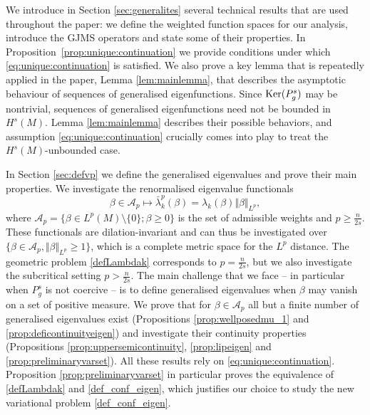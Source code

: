 \documentclass[10pt]{amsart}
\numberwithin{equation}{section}
\def\ker{{\mathop{\rm Ker}}}
\theoremstyle{plain}
\theoremstyle{remark}
\begin{document}
We introduce in Section \ref{sec:generalites} several technical results that are used throughout the paper: we define the weighted function spaces for our analysis, introduce the GJMS operators and state some of their properties. In Proposition~\ref{prop:unique:continuation} we provide conditions under which \eqref{eq:unique:continuation} is satisfied.  We also prove a key lemma that is repeatedly applied in the paper, Lemma \ref{lem:mainlemma}, that describes the asymptotic behaviour of sequences of generalised eigenfunctions. Since $\ker(P_g^s)$ may be nontrivial, sequences of generalised eigenfunctions need not be bounded in $H^s(M)$. Lemma  \ref{lem:mainlemma} describes their possible behaviors, and assumption \eqref{eq:unique:continuation} crucially comes into play to treat the $H^s(M)$-unbounded case. 

\medskip

In Section \ref{sec:defvp} we define the generalised eigenvalues and prove their main properties. We investigate the renormalised eigenvalue functionals 
$$\beta \in \mathcal{A}_p  \mapsto \bar{\lambda}_k^p(\beta) = \lambda_k(\beta)\Vert \beta \Vert_{L^p},$$
where $\mathcal{A}_p = \{ \beta \in L^{p}(M)\setminus \{0\} ; \beta \geq 0\}$ is the set of admissible weights and $p \geq \frac{n}{2s}$. These functionals are dilation-invariant and can thus be investigated over $\{ \beta \in \mathcal{A}_p, \Vert \beta \Vert_{L^p} \geq 1 \}$, which is a complete metric space for the $L^p$ distance. The geometric problem \eqref{defLambdak} corresponds to $p = \frac{n}{2s}$, but we also investigate the subcritical setting $p > \frac{n}{2s}$.  The main challenge that we face -- in particular when $P_g^s$ is not coercive -- is to define generalised eigenvalues when $\beta$ may vanish on a set of positive measure. We prove that for $\beta \in \mathcal{A}_p$ all but a finite number of generalised eigenvalues exist (Propositions \ref{prop:wellposedmu_1} and \ref{prop:deficontinuityeigen}) and investigate their continuity properties (Propositions \ref{prop:uppersemicontinuity}, \ref{prop:lipeigen} and \ref{prop:preliminaryvarset}). All these results rely on \eqref{eq:unique:continuation}. Proposition \ref{prop:preliminaryvarset} in particular proves the equivalence of \eqref{defLambdak} and \eqref{def_conf_eigen}, which justifies our choice to study the new variational problem \eqref{def_conf_eigen}. 

\medskip
\end{document}
